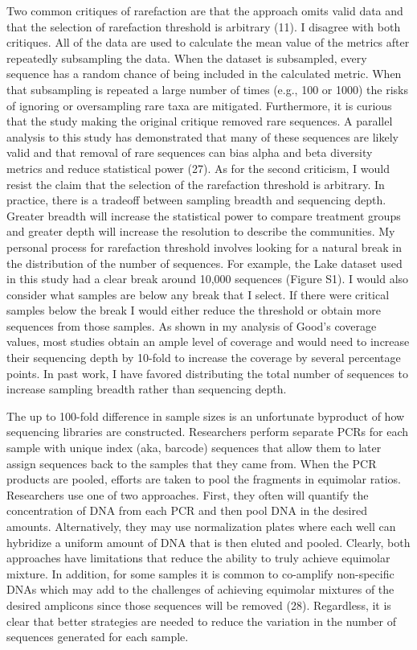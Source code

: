 \documentclass[
]{article}
\begin{document}
Two common critiques of rarefaction are that the approach omits valid
data and that the selection of rarefaction threshold is arbitrary (11).
I disagree with both critiques. All of the data are used to calculate
the mean value of the metrics after repeatedly subsampling the data.
When the dataset is subsampled, every sequence has a random chance of
being included in the calculated metric. When that subsampling is
repeated a large number of times (e.g., 100 or 1000) the risks of
ignoring or oversampling rare taxa are mitigated. Furthermore, it is
curious that the study making the original critique removed rare
sequences. A parallel analysis to this study has demonstrated that many
of these sequences are likely valid and that removal of rare sequences
can bias alpha and beta diversity metrics and reduce statistical power
(27). As for the second criticism, I would resist the claim that the
selection of the rarefaction threshold is arbitrary. In practice, there
is a tradeoff between sampling breadth and sequencing depth. Greater
breadth will increase the statistical power to compare treatment groups
and greater depth will increase the resolution to describe the
communities. My personal process for rarefaction threshold involves
looking for a natural break in the distribution of the number of
sequences. For example, the Lake dataset used in this study had a clear
break around 10,000 sequences (Figure S1). I would also consider what
samples are below any break that I select. If there were critical
samples below the break I would either reduce the threshold or obtain
more sequences from those samples. As shown in my analysis of Good's
coverage values, most studies obtain an ample level of coverage and
would need to increase their sequencing depth by 10-fold to increase the
coverage by several percentage points. In past work, I have favored
distributing the total number of sequences to increase sampling breadth
rather than sequencing depth.

The up to 100-fold difference in sample sizes is an unfortunate
byproduct of how sequencing libraries are constructed. Researchers
perform separate PCRs for each sample with unique index (aka, barcode)
sequences that allow them to later assign sequences back to the samples
that they came from. When the PCR products are pooled, efforts are taken
to pool the fragments in equimolar ratios. Researchers use one of two
approaches. First, they often will quantify the concentration of DNA
from each PCR and then pool DNA in the desired amounts. Alternatively,
they may use normalization plates where each well can hybridize a
uniform amount of DNA that is then eluted and pooled. Clearly, both
approaches have limitations that reduce the ability to truly achieve
equimolar mixture. In addition, for some samples it is common to
co-amplify non-specific DNAs which may add to the challenges of
achieving equimolar mixtures of the desired amplicons since those
sequences will be removed (28). Regardless, it is clear that better
strategies are needed to reduce the variation in the number of sequences
generated for each sample.
\end{document}
